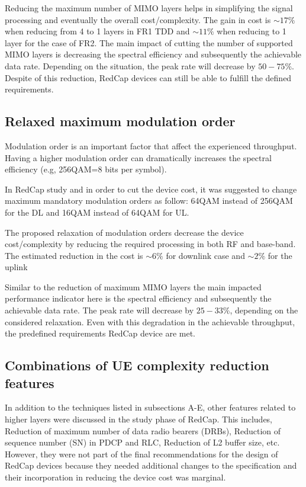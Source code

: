 \documentclass[conference]{IEEEtran}
\begin{document}
Reducing the maximum number of MIMO layers helps in simplifying the signal processing and eventually the overall cost/complexity. The gain in cost is $\sim17\%$ when reducing from 4 to 1 layers in FR1 TDD and $\sim11\%$ when reducing to 1 layer for the case of FR2.
The main impact of cutting the number of supported MIMO layers is decreasing the spectral efficiency and subsequently the achievable data rate. Depending on the situation, the peak rate will decrease by $50-75\%$. Despite of this reduction, RedCap devices can still be able to fulfill the defined requirements.

\subsection{Relaxed maximum modulation order}
\label{sec:4-5}

Modulation order is an important factor that affect the experienced throughput. Having a higher modulation order can dramatically increases the spectral efficiency (e.g, 256QAM=8 bits per symbol).

In RedCap study and in order to cut the device cost, it was suggested to change maximum mandatory modulation orders as follow: 64QAM instead of 256QAM for the DL  and 16QAM instead of 64QAM for UL.

The proposed relaxation of modulation orders decrease the device cost/complexity by reducing the required processing in both RF and base-band. The estimated reduction in the cost is $\sim6\%$ for downlink case and $\sim2\%$ for the uplink

Similar to the reduction of maximum MIMO layers the main impacted performance indicator here is the spectral efficiency and subsequently the achievable data rate. The peak rate will decrease by $25-33\%$, depending on the considered relaxation. Even with this degradation in the achievable throughput, the predefined requirements RedCap device are met.  

\subsection{Combinations of UE complexity reduction features}
\label{sec:4-6}
In addition to the techniques listed in subsections A-E, other features related to higher layers were discussed in the study phase of RedCap. This includes, Reduction of maximum number of data radio
bearers (DRBs), Reduction of sequence number (SN) in PDCP and RLC, Reduction of L2 buffer size, etc. However, they were not part of the final recommendations for the design of RedCap devices because they needed additional changes to the specification and their incorporation in reducing the device cost was marginal.
\end{document}
